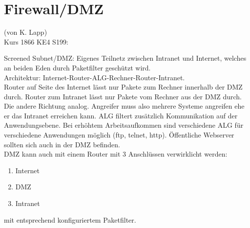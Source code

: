 \section*{Firewall/DMZ}
(von K. Lapp)\\

Kurs 1866 KE4  S199: 

Screened Subnet/DMZ: Eigenes Teilnetz zwischen Intranet und Internet, welches an beiden Eden durch Paketfilter geschützt wird. \\
Architektur: Internet-Router-ALG-Rechner-Router-Intranet.\\
Router auf Seite des Internet lässt nur Pakete zum Rechner innerhalb der DMZ durch. Router zum Intranet lässt nur Pakete vom Rechner aus der DMZ durch. Die andere Richtung analog. Angreifer muss also mehrere Systeme angreifen ehe er das Intranet erreichen kann. ALG filtert zusätzlich Kommunikation auf der Anwendungsebene. Bei erhöhtem Arbeitsaufkommen sind verschiedene ALG für verschiedene Anwendungen möglich (ftp, telnet, http). Öffentliche Webserver sollten sich auch in der DMZ befinden.\\
DMZ kann auch mit einem Router mit 3 Anschlüssen verwirklicht werden: \begin{enumerate}
  \item Internet
  \item DMZ
  \item Intranet
\end{enumerate}
mit entsprechend konfiguriertem Paketfilter.
